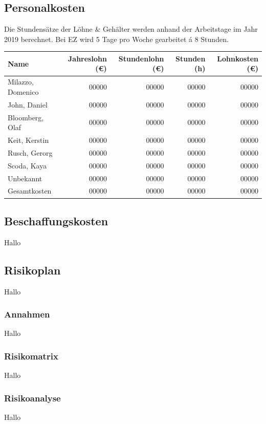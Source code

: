 \documentclass[a4paper,10pt]{scrartcl}
\begin{document}
\subsection{Personalkosten}
Die Stundensätze der Löhne \& Gehälter werden anhand der Arbeitstage im Jahr 2019 berechnet. Bei EZ wird 5 Tage pro Woche gearbeitet á 8 Stunden.
\hfill \vspace{5mm}
\begin{tabular}{lrrrr} 
\toprule
\textbf{Name} & \textbf{Jahreslohn (\euro{})} & \textbf{Stundenlohn (\euro{})} & \textbf{Stunden (h)} & \textbf{Lohnkosten (\euro{})}\\ 
\midrule 
Milazzo, Domenico  & 00000 & 00000 & 00000 & 00000\\
John, Daniel  & 00000 & 00000 & 00000 & 00000\\
Bloomberg, Olaf  & 00000 & 00000 & 00000 & 00000\\
Keit, Kerstin  & 00000 & 00000 & 00000 & 00000\\
Rusch, Gerorg & 00000 & 00000 & 00000 & 00000\\
Scoda, Kaya & 00000 & 00000 & 00000 & 00000\\
Unbekannt & 00000 & 00000 & 00000 & 00000\\
\midrule 
\midrule 
Gesamtkosten & 00000 & 00000 & 00000 & 00000\\ 
\bottomrule
\end{tabular}

\subsection{Beschaffungskosten}
Hallo

\subsection{Risikoplan}
Hallo

\subsubsection{Annahmen}
Hallo

\subsubsection{Risikomatrix}
Hallo

\subsubsection{Risikoanalyse}
Hallo
\end{document}
